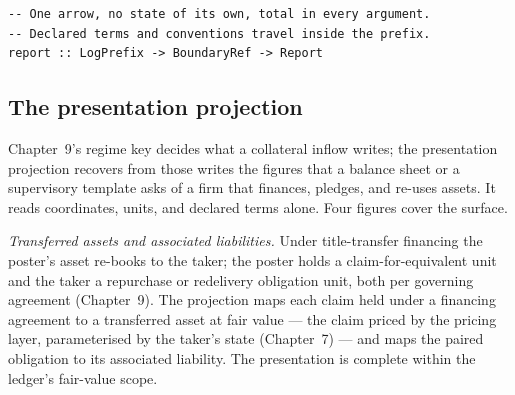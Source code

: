 \documentclass[11pt,a4paper]{article}
\begin{document}
\begin{lstlisting}
-- One arrow, no state of its own, total in every argument.
-- Declared terms and conventions travel inside the prefix.
report :: LogPrefix -> BoundaryRef -> Report
\end{lstlisting}

\subsection{The presentation projection}

Chapter~9's regime key decides what a collateral inflow writes; the
presentation projection recovers from those writes the figures that a balance
sheet or a supervisory template asks of a firm that finances, pledges, and
re-uses assets. It reads coordinates, units, and declared terms alone. Four
figures cover the surface.

\emph{Transferred assets and associated liabilities.} Under title-transfer
financing the poster's asset re-books to the taker; the poster holds a
claim-for-equivalent unit and the taker a repurchase or redelivery obligation
unit, both per governing agreement (Chapter~9). The projection maps each claim
held under a financing agreement to a transferred asset at fair value --- the
claim priced by the pricing layer, parameterised by the taker's state
(Chapter~7) --- and maps the paired obligation to its associated liability. The
presentation is complete within the ledger's fair-value scope.
\end{document}
